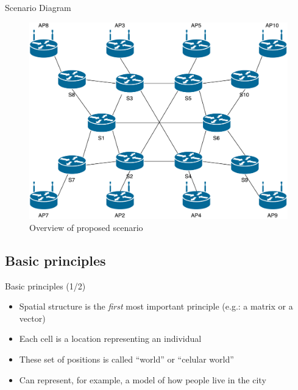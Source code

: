 \documentclass{beamer}
\begin{document}


\begin{frame}{Scenario Diagram}
	\begin{figure}
	\includegraphics[scale=0.3]{images/scenario.pdf}
	\caption{\scriptsize Overview of proposed scenario}
	\end{figure}
\end{frame}


\subsection{Basic principles}
\begin{frame}{Basic principles (1/2)}
\begin{itemize}
  \item Spatial structure is the \emph{first} most important principle (e.g.: a matrix or a vector)
  \item Each cell is a location representing an individual
  \item These set of positions is called ``world'' or ``celular world''
  \item Can represent, for example, a model of how people live in the city
\end{itemize}
\end{frame}
\end{document}
